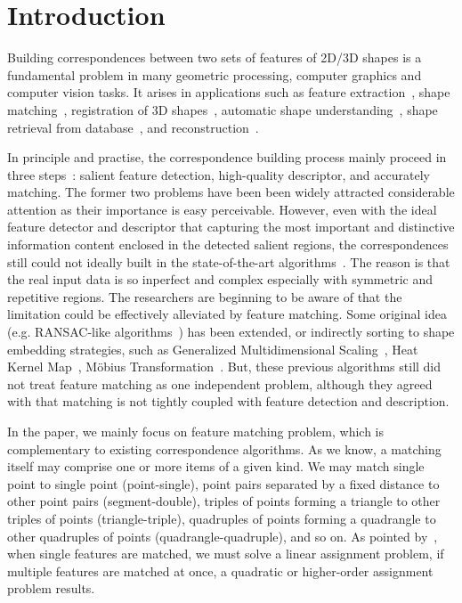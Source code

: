 \section{Introduction}
\label{sec:introduction}

Building correspondences between two sets of features of 2D/3D shapes is a fundamental problem in many geometric processing,
computer graphics and computer vision tasks.
It arises in applications such as feature extraction~\cite{Johnson99,Lowe04,Sun09,Toler10,Leutenegger11},
shape matching~\cite{Berg05,Brown07,Tevs09,Ovsjanikov10,Tevs11,SahilliogluY11,Windheuser11}, registration of 3D shapes~\cite{Gelfand05,Aiger08,li08,Zeng10,vanKaick11,Chang11},
automatic shape understanding~\cite{Lipman09,Sun10,Kim11}, shape retrieval from database~\cite{Bronstein11}, and reconstruction~\cite{Brown07,Chang11}.

In principle and practise, the correspondence building process mainly proceed in three steps~\cite{Lowe04,Leutenegger11}:
salient feature detection, high-quality descriptor, and accurately matching.
The former two problems have been been widely attracted considerable attention as their importance is easy perceivable.
However, even with the ideal feature detector and descriptor that capturing the most important and distinctive information content enclosed in the detected salient regions,
the correspondences still could not ideally built in the state-of-the-art algorithms~\cite{vanKaick11}.
The reason is that the real input data is so inperfect and complex especially with symmetric and repetitive regions.
The researchers are beginning to be aware of that the limitation could be effectively alleviated by feature matching.
Some original idea (e.g. RANSAC-like algorithms~\cite{Tevs09,Tevs11}) has been extended,
or indirectly sorting to shape embedding strategies, such as Generalized Multidimensional Scaling~\cite{Bronstein11},
Heat Kernel Map~\cite{Ovsjanikov10}, M{\"o}bius Transformation~\cite{Lipman09,Kim11}.
But, these previous algorithms still did not treat feature matching as one independent problem,
although they agreed with that matching is not tightly coupled with feature detection and description.

In the paper, we mainly focus on feature matching problem, which is complementary to existing correspondence algorithms.
As we know, a matching itself may comprise one or more items of a given kind.
We may match single point to single point (point-single),
point pairs separated by a fixed distance to other point pairs (segment-double),
triples of points forming a triangle to other triples of points (triangle-triple),
quadruples of points forming a quadrangle to other quadruples of points (quadrangle-quadruple), and so on.
As pointed by~\cite{Conte04}, when single features are matched,
we must solve a linear assignment problem, if multiple features are matched at once,
a quadratic or higher-order assignment problem results.

